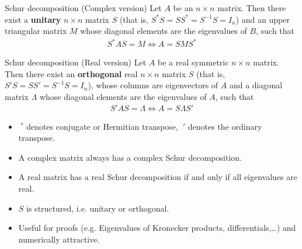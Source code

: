 \documentclass[handout]{beamer}  %
\begin{document}
\begin{frame}[shrink]
\frametitle{\secname}\framesubtitle{}\footnotesize
\begin{block}{Schur decomposition (Complex version)}
  Let $A$ be an $n \times n$ matrix. Then there exist a \textbf{unitary} $n\times n$ matrix $S$ (that is, $S^*S=SS^*=S^{-1}S=I_n$) and an upper triangular matrix $M$ whose diagonal elements are the eigenvalues of $B$, such that
  \begin{align*}
    S^* A S = M \Leftrightarrow A = S M S^*
  \end{align*}
\end{block}
\begin{block}{Schur decomposition (Real version)}
  Let $A$ be a real symmetric $n \times n$ matrix. Then there exist an \textbf{orthogonal} real $n\times n$ matrix $S$ (that is, $S'S=SS'=S^{-1}S=I_n$), whose columns are eigenvectors of $A$ and a diagonal matrix $\Lambda$ whose diagonal elements are the eigenvalues of $A$, such that
  \begin{align*}
    S' A S = \Lambda \Leftrightarrow A = S \Lambda S'
  \end{align*}
\end{block}
\begin{itemize}
  \item $~^*$ denotes conjugate or Hermitian transpose, $~'$ denotes the ordinary transpose.
  \item A complex matrix always has a complex Schur decomposition.
  \item A real matrix has a real Schur decomposition if and only if all eigenvalues are real.
  \item $S$ is structured, i.e. unitary or orthogonal.
  \item Useful for proofs (e.g. Eigenvalues of Kronecker products, differentials,\dots) and numerically attractive.
\end{itemize}
\end{frame}
\end{document}
